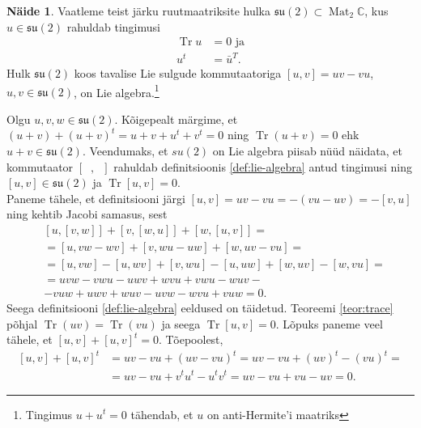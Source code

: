 \documentclass[a4paper,12pt]{article}
\theoremstyle{plain}
\theoremstyle{definition}
\newtheorem{naide}{Näide}[section]
\numberwithin{equation}{section}
\DeclareMathOperator{\Mat}{Mat}
\DeclareMathOperator{\Tr}{Tr}
\begin{document}
\begin{naide} \label{naide:su2}
Vaatleme teist järku ruutmaatriksite hulka $\mathfrak{su}\left(2\right) \subset \Mat_2 \mathbb{C}$, kus $u \in \mathfrak{su}\left(2\right)$ rahuldab tingimusi
\begin{align}
\Tr u &= 0 \text{ ja} \label{eq:su2-tr=0}\\ 
u^t &= \bar{u}^T. \label{eq:su2-antihermitian}
\end{align}
Hulk $\mathfrak{su}\left(2\right)$ koos tavalise Lie sulgude kommutaatoriga $\left[u,v\right] = uv - vu$, $u, v \in \mathfrak{su}\left(2\right)$, on Lie algebra.\footnote{Tingimus $u + u^t = 0$ tähendab, et $u$ on anti-Hermite'i maatriks}

Olgu $u, v, w \in \mathfrak{su}\left(2\right)$. Kõigepealt märgime, et $\left(u + v\right) + \left(u + v\right)^t = u + v + u^t + v^t = 0$ ning $\Tr \left(u + v\right) = 0$ ehk $u + v \in \mathfrak{su}\left(2\right)$. Veendumaks, et $su\left(2\right)$ on Lie algebra piisab nüüd näidata, et kommutaator $\left[\phantom{u}, \phantom{u}\right]$ rahuldab definitsioonis \ref{def:lie-algebra} antud tingimusi ning $\left[u,v\right] \in \mathfrak{su}\left(2\right)$ ja $\Tr \left[u,v\right] = 0$. \\
Paneme tähele, et definitsiooni järgi $\left[u,v\right] = uv - vu = - \left(vu - uv\right) = - \left[v,u\right]$ ning 
kehtib Jacobi samasus, sest
\begin{align*}
&\left[u, \left[v, w\right]\right] + \left[v, \left[w, u\right]\right] + \left[w, \left[u, v\right]\right] = \\
&= \left[u, vw - wv \right] + \left[v, wu - uw \right] + \left[w, uv - vu \right] = \\
&= \left[u, vw\right] - \left[u, wv\right] + \left[v, wu\right] - \left[u, uw\right] + \left[w, uv\right] - \left[w, vu\right] = \\
&= uvw - vwu - uwv + wvu + vwu - wuv - \\
&- vuw + uwv + wuv - uvw - wvu + vuw = 0.
\end{align*}
Seega definitsiooni \ref{def:lie-algebra} eeldused on täidetud. Teoreemi \ref{teor:trace} põhjal $\Tr \left(uv\right) = \Tr \left(vu\right)$ ja seega $\Tr \left[u,v\right] = 0$. Lõpuks paneme veel tähele, et $\left[u,v\right] + \left[u,v\right]^t = 0$. Tõepoolest,
\begin{align*}
\left[u,v\right] + \left[u,v\right]^t &= uv - vu + \left(uv - vu\right)^t = uv - vu + \left(uv\right)^t - \left(vu\right)^t = \\
&= uv - vu + v^t u^t - u^t v^t = uv - vu + vu - uv = 0.
\end{align*}
\end{naide}
\end{document}
